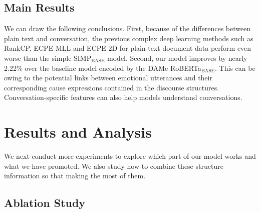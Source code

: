 \documentclass[11pt]{article}
\begin{document}
\subsection{Main Results}
We can draw the following conclusions. 
First, because of the differences between plain text and conversation, the previous complex deep learning methods such as RankCP, ECPE-MLL and ECPE-2D for plain text document data perform even worse than the simple SIMP$_{\textrm{BASE}}$ model.
Second, our model improves by nearly 2.22\% over the baseline model encoded by the DAMe RoBERTa$_{\textrm{BASE}}$.
This can be owing to the potential links between emotional utterances and their corresponding cause expressions contained in the discourse structures. 
Conversation-specific features can also help models understand conversations.


\section{Results and Analysis}\label{sec:results}
We next conduct more experiments to explore which part of our model works and what we have promoted.
We also study how to combine these structure information so that making the most of them.

\subsection{Ablation Study}
\end{document}
